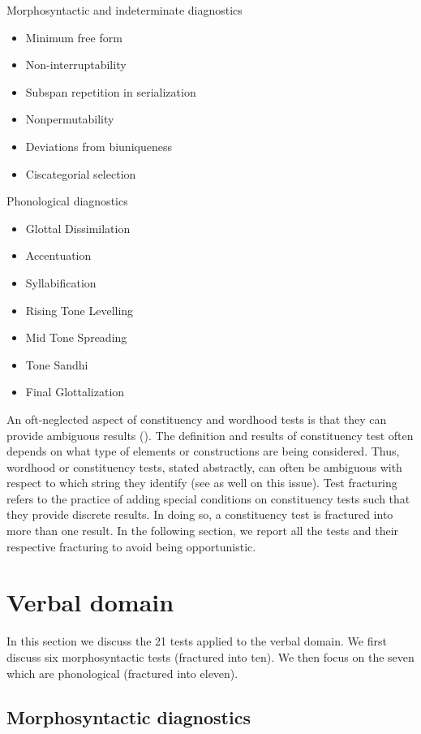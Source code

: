 \documentclass[output=paper]{langscibook}
\begin{document}
\ea \label{ex:key:zap:10} Morphosyntactic and indeterminate diagnostics
\begin{itemize} 
    \item Minimum free form
    \item Non-interruptability 
    \item Subspan repetition in serialization
    \item Nonpermutability 
    \item Deviations from biuniqueness
    \item Ciscategorial selection
\end{itemize}
\newpage
\ex \label{ex:key:zap:11} Phonological diagnostics 
\begin{itemize}
    \item Glottal Dissimilation 
    \item Accentuation
    \item Syllabification 
    \item Rising Tone Levelling 
    \item Mid Tone Spreading 
    \item Tone Sandhi 
    \item Final Glottalization
\end{itemize}
\z 

An oft-neglected aspect of constituency and wordhood tests is that they can provide ambiguous results (\citealt{Tallman2020,Tallman2021}). The definition and results of constituency test often depends on what type of elements or constructions are being considered. Thus, wordhood or constituency tests, stated abstractly, can often be ambiguous with respect to which string they identify (see \citealt{Osborne2018} as well on this issue). Test fracturing refers to the practice of adding special conditions on constituency tests such that they provide discrete results. In doing so, a constituency test is fractured into more than one result. In the following section, we report all the tests and their respective fracturing to avoid being opportunistic.


\section{Verbal domain}
\label{bkm:Ref82615684}
In this section we discuss the 21 tests applied to the verbal domain. We first discuss six morphosyntactic tests (fractured into ten). We then focus on the seven which are phonological (fractured into eleven).

\subsection{ Morphosyntactic diagnostics} 
\end{document}
